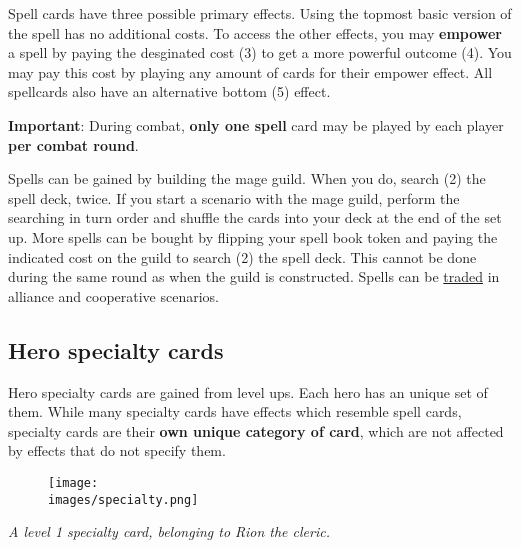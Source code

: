 Spell cards have three possible primary effects.
Using the topmost basic version of the spell has no additional costs.
To access the other effects, you may \textbf{empower} a spell by paying the desginated cost (3) to get a more powerful outcome (4).
You may pay this cost by playing any amount of cards for their empower  effect.
All spellcards also have an alternative bottom (5)  effect.\par

\textbf{Important}: During combat, \textbf{only one spell} card may be played by each player \textbf{per combat round}.\par
Spells can be gained by building the mage guild.
When you do, search (2) the spell deck, twice.
If you start a scenario with the mage guild, perform the searching in turn order and shuffle the cards into your deck at the end of the set up.
More spells can be bought by flipping your spell book token and paying the indicated cost on the guild to search (2) the spell deck.
This cannot be done during the same round as when the guild is constructed.
Spells can be \hyperlink{Trading}{traded} in alliance and cooperative scenarios.

\subsection*{\hypertarget{Specialty}{Hero specialty cards}}
Hero specialty cards are gained from level ups.
Each hero has an unique set of them.
While many specialty cards have effects which resemble spell cards, specialty cards are their \textbf{own unique category of card}, which are not affected by effects that do not specify them.
\par

\begin{figure}[h]
\centering
\texttt{[image: \\images/specialty.png]}
\end{figure}
\begin{center}
\textit{A level 1 specialty card, belonging to Rion the cleric.}
\end{center}
